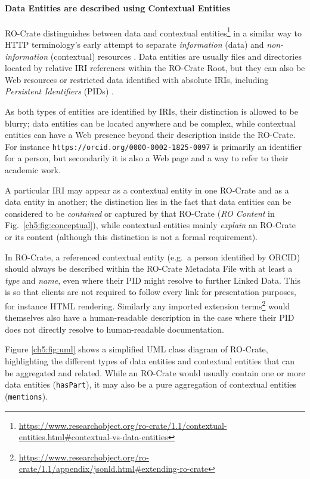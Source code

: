 \paragraph{Data Entities are described using Contextual
Entities}\label{ch5:contextualentities}

RO-Crate distinguishes between data and contextual
entities\footnote{\url{https://www.researchobject.org/ro-crate/1.1/contextual-entities.html\#contextual-vs-data-entities}} in a similar way to HTTP terminology's early
attempt to separate \emph{information} (data) and \emph{non-information}
(contextual) resources \cite{ch5-120}. Data entities are usually files and directories located by relative IRI
references within the RO-Crate Root, but they can also be Web resources
or restricted data identified with absolute IRIs, including
\emph{Persistent Identifiers} (PIDs)
\cite{ch5-86}.

As both types of entities are identified by IRIs, their distinction is
allowed to be blurry; data entities can be located anywhere and be
complex, while contextual entities can have a Web presence beyond their
description inside the RO-Crate. For instance
\texttt{https://orcid.org/0000-0002-1825-0097} is primarily an
identifier for a person, but secondarily it is also a Web page and a way
to refer to their academic work.

A particular IRI may appear as a contextual entity in one RO-Crate and
as a data entity in another; the distinction lies in the fact that data
entities can be considered to be \emph{contained} or captured by that
RO-Crate (\textit{RO Content} in Fig.~\ref{ch5:fig:conceptual}), while contextual entities mainly \emph{explain} an RO-Crate or its
content (although this distinction is not a formal requirement).

In RO-Crate, a referenced contextual entity (e.g.~a person identified by
ORCID) should always be described within the RO-Crate Metadata File with
at least a \emph{type} and \emph{name}, even where their PID might
resolve to further Linked Data. This is so that clients are not required
to follow every link for presentation purposes, for instance HTML
rendering. Similarly any imported extension
terms\footnote{\url{https://www.researchobject.org/ro-crate/1.1/appendix/jsonld.html\#extending-ro-crate}} would themselves also have a human-readable description in the
case where their PID does not directly resolve to human-readable
documentation.

Figure \vref{ch5:fig:uml} shows a simplified UML class
diagram of RO-Crate, highlighting the different types of data entities
and contextual entities that can be aggregated and related. While an
RO-Crate would usually contain one or more data entities
(\texttt{hasPart}), it may also be a pure aggregation of contextual
entities (\texttt{mentions}).

